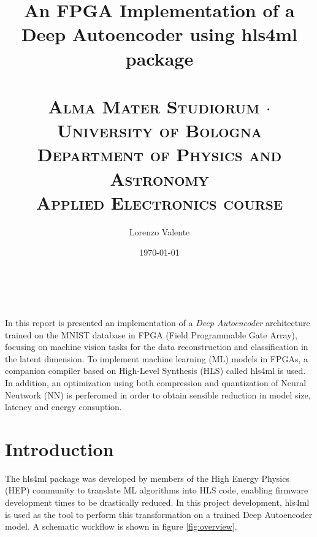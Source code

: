 \documentclass{article}
\title{
  \huge{\textbf{An FPGA Implementation of a\\ Deep Autoencoder using hls4ml package \\}}
  \Large{\textsc{\\ Alma Mater Studiorum $\cdot$ University of Bologna \\ }}
  \large{\textsc{Department of Physics and Astronomy \\}}
  \normalsize{\textsc{Applied Electronics course}}
  } %
\author{Lorenzo Valente} %
\date{\today} %
\begin{document}
\maketitle %

\begin{center}
\begin{tabular}{l r}
\end{tabular}
\end{center}


\clearpage
\section*{}
In this report is presented an implementation of a \textit{Deep Autoencoder} 
architecture trained on the MNIST database in FPGA (Field Programmable Gate Array), 
focusing on machine vision tasks for the data reconstruction and classification in the latent dimension.
To implement machine learning (ML) models in FPGAs, a companion compiler 
based on High-Level Synthesis (HLS) called hls4ml is used. 
In addition, an optimization using both compression and quantization of Neural Neutwork (NN) is perferomed in order to obtain 
sensible reduction in model size, latency and energy consuption.

\clearpage
\tableofcontents %
\clearpage


\section{Introduction} 

The hls4ml package was developed by members of the High Energy Physics (HEP) community
to translate ML algorithms into HLS code, enabling firmware development times to be drastically reduced.
In this project development, hls4ml is used as the tool to perform 
this transformation on a trained Deep Autoencoder model.
A schematic workflow is shown in figure \ref{fig:overview}.
\end{document}
